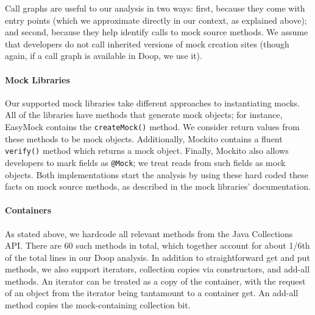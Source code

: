 Call graphs are useful to our analysis in two ways: first, because they come with entry points (which we approximate directly in our context, as explained above); and second, because they help identify calls to mock source methods. We assume that developers do not call inherited versions of mock creation sites (though again, if a call graph is available in Doop, we use it).

\paragraph{Mock Libraries}
Our supported mock libraries take different approaches to instantiating mocks. All of the libraries have methods that generate mock objects; for instance, EasyMock contains the \texttt{createMock()} method. We consider return values from these methods to be mock objects. Additionally, Mockito contains a fluent \texttt{verify()} method which returns a mock object. Finally, Mockito also allows developers to mark fields as \texttt{@Mock}; we treat reads from such fields as mock objects. Both implementations start the analysis by using these hard coded these facts on mock source methods, as described in the mock libraries' documentation.

\paragraph{Containers} 
As stated above, we hardcode all relevant methods from the Java Collections API. There are 60 such methods in total, which together account for about 1/6th of the total lines in our Doop analysis. In addition to straightforward get and put methods, we also support iterators, collection copies via constructors, and add-all methods. An iterator can be treated as a copy of the container, with the request of an object from the iterator being tantamount to a container get. An add-all method copies the mock-containing collection bit.
